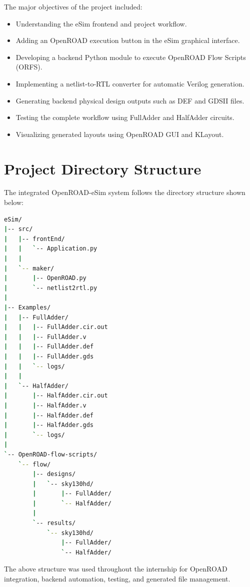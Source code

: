 The major objectives of the project included:

\begin{itemize}
    \item Understanding the eSim frontend and project workflow.
    \item Adding an OpenROAD execution button in the eSim graphical interface.
    \item Developing a backend Python module to execute OpenROAD Flow Scripts (ORFS).
    \item Implementing a netlist-to-RTL converter for automatic Verilog generation.
    \item Generating backend physical design outputs such as DEF and GDSII files.
    \item Testing the complete workflow using FullAdder and HalfAdder circuits.
    \item Visualizing generated layouts using OpenROAD GUI and KLayout.
\end{itemize}

\section{Project Directory Structure}

The integrated OpenROAD-eSim system follows the directory structure shown below:

\begin{lstlisting}[language=bash, caption={Project directory structure used during integration.}]
eSim/
|-- src/
|   |-- frontEnd/
|   |   `-- Application.py
|   |
|   `-- maker/
|       |-- OpenROAD.py
|       `-- netlist2rtl.py
|
|-- Examples/
|   |-- FullAdder/
|   |   |-- FullAdder.cir.out
|   |   |-- FullAdder.v
|   |   |-- FullAdder.def
|   |   |-- FullAdder.gds
|   |   `-- logs/
|   |
|   `-- HalfAdder/
|       |-- HalfAdder.cir.out
|       |-- HalfAdder.v
|       |-- HalfAdder.def
|       |-- HalfAdder.gds
|       `-- logs/
|
`-- OpenROAD-flow-scripts/
    `-- flow/
        |-- designs/
        |   `-- sky130hd/
        |       |-- FullAdder/
        |       `-- HalfAdder/
        |
        `-- results/
            `-- sky130hd/
                |-- FullAdder/
                `-- HalfAdder/
\end{lstlisting}

The above structure was used throughout the internship for OpenROAD integration, backend automation, testing, and generated file management.